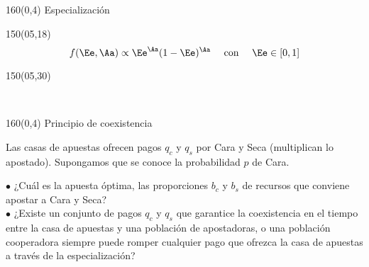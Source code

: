 \documentclass[shownotes,aspectratio=169]{beamer}
\begin{document}
\begin{frame}[plain]
\begin{textblock}{160}(0,4)
 \centering \LARGE
 Especialización
\end{textblock}
\vspace{1cm}

\begin{textblock}{150}(05,18)
\begin{equation*}
f(\Ee,\Aa) \propto \Ee^\Aa(1-\Ee)^\Aa \text{  \ \ \  con \ \ \  } \Ee \in [0,1]
\end{equation*}
\end{textblock}


\begin{textblock}{150}(05,30)
\begin{figure}[H]
    \centering
    \begin{subfigure}[b]{0.49\linewidth}
    \end{subfigure}
    \ 
    \begin{subfigure}[b]{0.49\linewidth}
    \end{subfigure}
    \label{fig:tasa-temporal-2}
\end{figure}
\end{textblock}
\end{frame}


\begin{frame}[plain]
\begin{textblock}{160}(0,4)
 \centering \LARGE Principio de coexistencia
\end{textblock}
\vspace{1cm}

\normalsize

Las casas de apuestas ofrecen pagos $q_c$ y $q_s$ por Cara y Seca (multiplican lo apostado).
Supongamos que se conoce la probabilidad $p$ de Cara.

\vspace{0.3cm} \pause

$\bullet$ ¿Cuál es la apuesta óptima, las proporciones $b_c$ y $b_s$ de recursos que conviene apostar a Cara y Seca? \\ \pause
$\bullet$ ¿Existe un conjunto de pagos $q_c$ y $q_s$ que garantice la coexistencia en el tiempo entre la casa de apuestas y una población de apostadoras, o una población cooperadora siempre puede romper cualquier pago que ofrezca la casa de apuestas a través de la especialización?

\end{frame}
\end{document}
